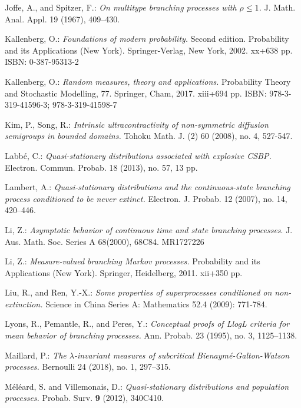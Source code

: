 \documentclass[12pt,a4paper]{amsart}
\numberwithin{equation}{section}
\theoremstyle{plain}
\theoremstyle{definition}
\theoremstyle{remark}
\begin{document}
\begin{thebibliography}{99}
	Joffe, A., and Spitzer, F.:
	\emph{On multitype branching processes with $\rho \leq 1$.}
	J. Math. Anal. Appl. 19 (1967), 409–430.
	
	Kallenberg, O.:
	\emph{Foundations of modern probability.}
	Second edition. Probability and its Applications (New York). Springer-Verlag, New York, 2002. xx+638 pp. ISBN: 0-387-95313-2
	
	Kallenberg, O.:
	\emph{Random measures, theory and applications.}
	Probability Theory and Stochastic Modelling, 77. Springer, Cham, 2017. xiii+694 pp. ISBN: 978-3-319-41596-3; 978-3-319-41598-7
	
	Kim, P., Song, R.:
	\emph{Intrinsic ultracontractivity of non-symmetric diffusion semigroups in bounded domains.}
	Tohoku Math. J. (2) 60 (2008), no. 4, 527-547.
	
	Labb\'e, C.:
	\emph{Quasi-stationary distributions associated with explosive CSBP.}
	Electron. Commun. Probab. 18 (2013), no. 57, 13 pp.
	
	Lambert, A.:
	\emph{Quasi-stationary distributions and the continuous-state branching process conditioned to be never extinct.}
	Electron. J. Probab. 12 (2007), no. 14, 420–446.

	 Li, Z.:
	\emph{Asymptotic behavior of continuous time and state branching processes}. J. Aus. Math. Soc. Series A 68(2000), 68C84. MR1727226

	Li, Z.:
	\emph{Measure-valued branching Markov processes.}
	Probability and its Applications (New York). Springer, Heidelberg, 2011. xii+350 pp.
	
	Liu, R., and Ren, Y.-X.: 
	\emph{Some properties of superprocesses conditioned on non-extinction.} 
	Science in China Series A: Mathematics 52.4 (2009): 771-784.
	
	Lyons, R., Pemantle, R., and Peres, Y.:
	\emph{Conceptual proofs of LlogL criteria for mean behavior of branching processes.}
	Ann. Probab. 23 (1995), no. 3, 1125–1138.
	
	Maillard, P.:
	\emph{The $\lambda$-invariant measures of subcritical Bienaymé-Galton-Watson processes.}
	Bernoulli 24 (2018), no. 1, 297–315.

	M\'el\'eard, S. and Villemonais, D.:
	\emph{Quasi-stationary distributions and population processes.}
	Probab. Surv. \textbf{9} (2012), 340C410.
	

\end{thebibliography}
\end{document}
